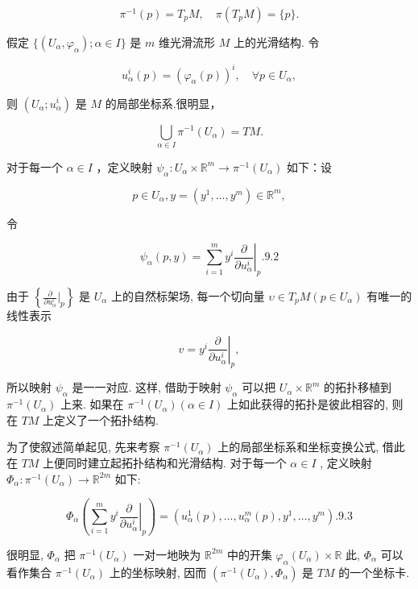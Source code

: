 $$
\pi^ {- 1} (p) = T _ {p} M, \quad \pi (T _ {p} M) = \{p \}.
$$

假定  $\{(U_{\alpha},\varphi_{\alpha});\alpha \in I\}$  是  $m$  维光滑流形  $M$  上的光滑结构. 令

$$
u _ {\alpha} ^ {i} (p) = \left(\varphi_ {\alpha} (p)\right) ^ {i}, \quad \forall p \in U _ {\alpha},
$$

则  $(U_{\alpha};u_{\alpha}^{i})$  是  $M$  的局部坐标系.很明显，

$$
\bigcup_ {\alpha \in I} \pi^ {- 1} (U _ {\alpha}) = T M.
$$

对于每一个  $\alpha \in I$  ，定义映射  $\psi_{\alpha}:U_{\alpha}\times \mathbb{R}^{m}\to \pi^{-1}(U_{\alpha})$  如下：设

$$
p \in U _ {\alpha}, y = (y ^ {1}, \dots , y ^ {m}) \in \mathbb {R} ^ {m},
$$

令

$$
\psi_ {\alpha} (p, y) = \sum_ {i = 1} ^ {m} y ^ {i} \left. \frac {\partial}{\partial u _ {\alpha} ^ {i}} \right| _ {p}.  {9.2}
$$

由于  $\left\{\frac{\partial}{\partial u_{\alpha}^{\iota}}\bigg|_{p}\right\}$  是  $U_{\alpha}$  上的自然标架场, 每一个切向量  $\upsilon \in T_pM(p \in U_\alpha)$  有唯一的线性表示

$$
v = y ^ {i} \left. \frac {\partial}{\partial u _ {\alpha} ^ {i}} \right| _ {p},
$$

所以映射  $\psi_{\alpha}$  是一一对应. 这样, 借助于映射  $\psi_{\alpha}$  可以把  $U_{\alpha} \times \mathbb{R}^{m}$  的拓扑移植到  $\pi^{-1}(U_{\alpha})$  上来. 如果在  $\pi^{-1}(U_{\alpha})(\alpha \in I)$  上如此获得的拓扑是彼此相容的, 则在  $TM$  上定义了一个拓扑结构.

为了使叙述简单起见, 先来考察  $\pi^{-1}(U_{\alpha})$  上的局部坐标系和坐标变换公式, 借此在  $TM$  上便同时建立起拓扑结构和光滑结构. 对于每一个  $\alpha \in I$ , 定义映射  $\Phi_{\alpha}: \pi^{-1}(U_{\alpha}) \to \mathbb{R}^{2m}$  如下:

$$
\Phi_ {\alpha} \left(\sum_ {i = 1} ^ {m} y ^ {i} \left. \frac {\partial}{\partial u _ {\alpha} ^ {i}} \right| _ {p}\right) = \left(u _ {\alpha} ^ {1} (p), \dots , u _ {\alpha} ^ {m} (p), y ^ {1}, \dots , y ^ {m}\right).  {9.3}
$$

很明显,  $\Phi_{\alpha}$  把  $\pi^{-1}(U_{\alpha})$  一对一地映为  $\mathbb{R}^{2m}$  中的开集  $\varphi_{\alpha}(U_{\alpha}) \times \mathbb{R}$  此,  $\Phi_{\alpha}$  可以看作集合  $\pi^{-1}(U_{\alpha})$  上的坐标映射, 因而  $(\pi^{-1}(U_{\alpha}), \Phi_{\alpha})$  是  $TM$  的一个坐标卡.

